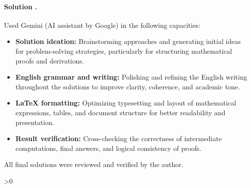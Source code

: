 \documentclass{article}
\newcounter{placeholderCount}
\newcounter{solutionCount}
\newcommand{\solution}[1]{
    \stepcounter{solutionCount}
    \paragraph{Solution \thesolutionCount.}
    {
        #1
    }
}
\begin{document}
\solution{
    Used Gemini (AI assistant by Google) in the following capacities:
    \begin{itemize}
        \item \textbf{Solution ideation:} Brainstorming approaches and generating initial ideas for problem-solving strategies, particularly for structuring mathematical proofs and derivations.
        \item \textbf{English grammar and writing:} Polishing and refining the English writing throughout the solutions to improve clarity, coherence, and academic tone.
        \item \textbf{\LaTeX{} formatting:} Optimizing typesetting and layout of mathematical expressions, tables, and document structure for better readability and presentation.
        \item \textbf{Result verification:} Cross-checking the correctness of intermediate computations, final answers, and logical consistency of proofs.
    \end{itemize}
    All final solutions were reviewed and verified by the author.
}

\ifnum\value{placeholderCount}>0
    \vfill
    \begin{center}
        \color{red} 
    \end{center}
\fi
\end{document}
